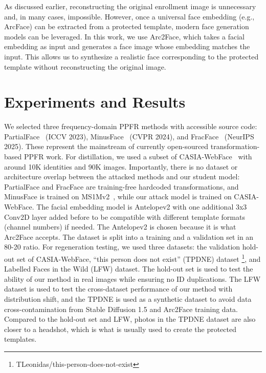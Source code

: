 As discussed earlier, reconstructing the original enrollment image is unnecessary and, in many cases, impossible. However, once a universal face embedding (e.g., ArcFace) can be extracted from a protected template, modern face generation models can be leveraged. In this work, we use Arc2Face, which takes a facial embedding as input and generates a face image whose embedding matches the input. This allows us to synthesize a realistic face corresponding to the protected template without reconstructing the original image.

















\section{Experiments and Results}
We selected three frequency-domain PPFR methods with accessible source code: PartialFace~\cite{mi_privacy-preserving_2023} (ICCV 2023), MinusFace~\cite{mi_privacy-preserving_2024} (CVPR 2024), and FracFace~\cite{dai_fracface_2025} (NeurIPS 2025). These represent the mainstream of currently open-sourced transformation-based PPFR work. For distillation, we used a subset of CASIA-WebFace~\cite{yi_learning_2014} with around 10K identities and 90K images. Importantly, there is no dataset or architecture overlap between the attacked methods and our student model: PartialFace and FracFace are training-free hardcoded transformations, and MinusFace is trained on MS1Mv2~\cite{guo_ms-celeb-1m_2016}, while our attack model is trained on CASIA-WebFace. The facial embedding model is Antelopev2 with one additional 3x3 Conv2D layer added before to be compatible with different template formats (channel numbers) if needed. The Antelopev2 is chosen because it is what Arc2Face accepts. The dataset is split into a training and a validation set in an 80-20 ratio. For regeneration testing, we used three datasets: the validation hold-out set of CASIA-WebFace, ``this person does not exist'' (TPDNE) dataset \footnote{TLeonidas/this-person-does-not-exist}, and Labelled Faces in the Wild (LFW) dataset. The hold-out set is used to test the ability of our method in real images while ensuring no ID duplications. The LFW dataset is used to test the cross-dataset performance of our method with distribution shift, and the TPDNE is used as a synthetic dataset to avoid data cross-contamination from Stable Diffusion 1.5 and Arc2Face training data. Compared to the hold-out set and LFW, photos in the TPDNE dataset are also closer to a headshot, which is what is usually used to create the protected templates.

